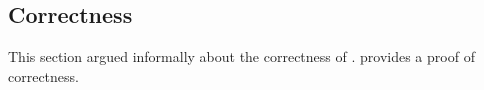 


\subsection{Correctness}
This section argued informally about the correctness of \sys{}.  provides a proof of correctness.